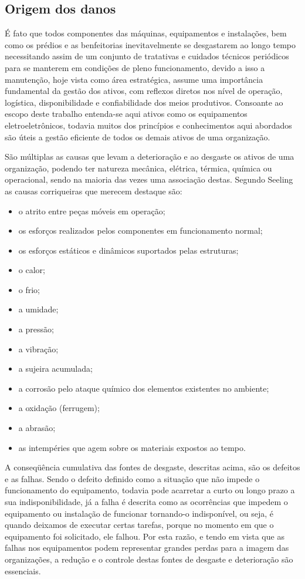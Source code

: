\subsection{Origem dos danos}

É fato que todos componentes das máquinas, equipamentos e instalações, bem como os prédios e as benfeitorias inevitavelmente se desgastarem ao longo tempo necessitando assim de um conjunto de tratativas e cuidados técnicos periódicos para se manterem em condições de pleno funcionamento, devido a isso a manutenção, hoje vista como área estratégica, assume uma importância fundamental da gestão dos ativos, com reflexos diretos nos nível de operação, logística, disponibilidade e confiabilidade dos meios produtivos. Consoante ao escopo deste trabalho entenda-se aqui ativos como os equipamentos eletroeletrônicos, todavia muitos dos princípios e conhecimentos aqui abordados são úteis a gestão eficiente de todos os demais ativos de uma organização. 

São múltiplas as causas que levam a deterioração e ao desgaste os ativos de uma organização, podendo ter natureza mecânica, elétrica, térmica, química ou operacional, sendo na maioria das vezes uma associação destas. Segundo Seeling \cite{seeling2000} as causas corriqueiras que merecem destaque são:

\begin{itemize}
	\item o atrito entre peças móveis em operação;
	\item os esforços realizados pelos componentes em funcionamento normal;
	\item os esforços estáticos e dinâmicos suportados pelas estruturas;
	\item o calor;
	\item o frio;
	\item a umidade;
	\item a pressão;
	\item a vibração;
	\item a sujeira acumulada;
	\item a corrosão pelo ataque químico dos elementos existentes no ambiente;
	\item a oxidação (ferrugem);
	\item a abrasão;
	\item as intempéries que agem sobre os materiais expostos ao tempo.
\end{itemize}


A conseqüência cumulativa das fontes de desgaste, descritas acima, são os defeitos e as falhas. Sendo o defeito definido como a situação que não impede o funcionamento do equipamento, todavia pode acarretar a curto ou longo prazo a sua indisponibilidade, já a falha é descrita como as ocorrências que impedem o equipamento ou instalação de funcionar tornando-o indisponível, ou seja, é quando deixamos de executar certas tarefas, porque no momento em que o equipamento foi solicitado, ele falhou. Por esta razão, e tendo em vista que as falhas nos equipamentos podem representar grandes perdas para a imagem das organizações, a redução e o controle destas fontes de desgaste e deterioração são essenciais.

